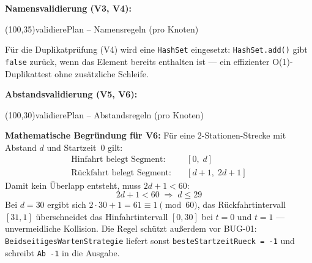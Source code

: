 \documentclass[12pt,a4paper]{article}
\begin{document}
\textbf{Namensvalidierung (V3, V4):}

\begin{center}
\begin{struktogramm}(100,35){validierePlan -- Namensregeln (pro Knoten)}
    \change
      \change
      \ifend
    \ifend
  \whileend
\end{struktogramm}
\end{center}

Für die Duplikatprüfung (V4) wird eine \texttt{HashSet} eingesetzt:
\texttt{HashSet.add()} gibt \texttt{false} zurück, wenn das Element bereits
enthalten ist --- ein effizienter O(1)-Duplikattest ohne zusätzliche Schleife.

\textbf{Abstandsvalidierung (V5, V6):}

\begin{center}
\begin{struktogramm}(100,30){validierePlan -- Abstandsregeln (pro Knoten)}
    \change
      \change
      \ifend
    \ifend
  \change
  \ifend
\end{struktogramm}
\end{center}

\textbf{Mathematische Begründung für V6:}
Für eine 2-Stationen-Strecke mit Abstand $d$ und Startzeit~0 gilt:
\begin{align*}
  \text{Hinfahrt belegt Segment:}  &\quad [0,\; d] \\
  \text{Rückfahrt belegt Segment:} &\quad [d+1,\; 2d+1]
\end{align*}
Damit kein Überlapp entsteht, muss $2d + 1 < 60$:
\[
  2d + 1 < 60 \;\Longrightarrow\; d \leq 29
\]
Bei $d = 30$ ergibt sich $2 \cdot 30 + 1 = 61 \equiv 1 \pmod{60}$, das
Rückfahrtintervall $[31, 1]$ überschneidet das Hinfahrtintervall $[0, 30]$
bei $t = 0$ und $t = 1$ --- unvermeidliche Kollision. Die Regel schützt
außerdem vor BUG-01: \texttt{BeidseitigesWartenStrategie} liefert sonst
\texttt{besteStartzeitRueck = -1} und schreibt \texttt{Ab -1} in die Ausgabe.
\end{document}
